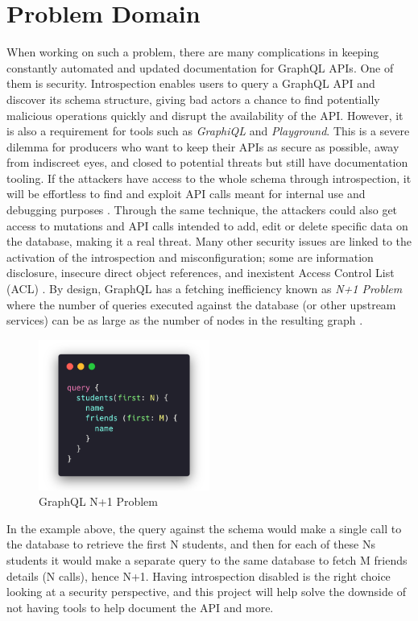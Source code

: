 \section*{Problem Domain}
\label{s:Problem-Domain}
When working on such a problem, there are many complications in keeping
constantly automated and updated documentation for GraphQL APIs. One of them is
security. Introspection enables users to query a GraphQL API and discover its
schema structure, giving bad actors a chance to find potentially malicious
operations \citep{khalilWhyYouShould2021} quickly and disrupt the availability
of the API. However, it is also a requirement for tools such as
\textit{GraphiQL} and \textit{Playground}. This is a severe dilemma for
producers who want to keep their APIs as secure as possible, away from
indiscreet eyes, and closed to potential threats but still have documentation
tooling. If the attackers have access to the whole schema through introspection,
it will be effortless to find and exploit API calls meant for internal use and
debugging purposes \citep{rizwanGraphQLCommonVulnerabilities2021}. Through the
same technique, the attackers could also get access to mutations and API calls
intended to add, edit or delete specific data on the database, making it a real
threat. Many other security issues are linked to the activation of the
introspection and misconfiguration; some are information disclosure, insecure
direct object references, and inexistent Access Control List (ACL) \citep{
yeswehackHowExploitGraphQL2021}. By design, GraphQL has a fetching inefficiency
known as \textit{N+1 Problem} where the number of queries executed against the
database (or other upstream services) can be as large as the number of nodes in
the resulting graph \citep{ graphqlbypopSuppressingProblemGraphQL2020}.
\begin{figure}[H]
  \centering
  \includegraphics[width=0.5\textwidth]{figures/code/n+1}
  \caption{GraphQL N+1 Problem}
  \label{f:GraphQL-N1-Problem}
\end{figure}
In the example above, the query against the schema would make a single call to
the database to retrieve the first N students, and then for each of these Ns
students it would make a separate query to the same database to fetch M friends
details (N calls), hence N+1. Having introspection disabled is the right choice
looking at a security perspective, and this project will help solve the downside
of not having tools to help document the API and more.

